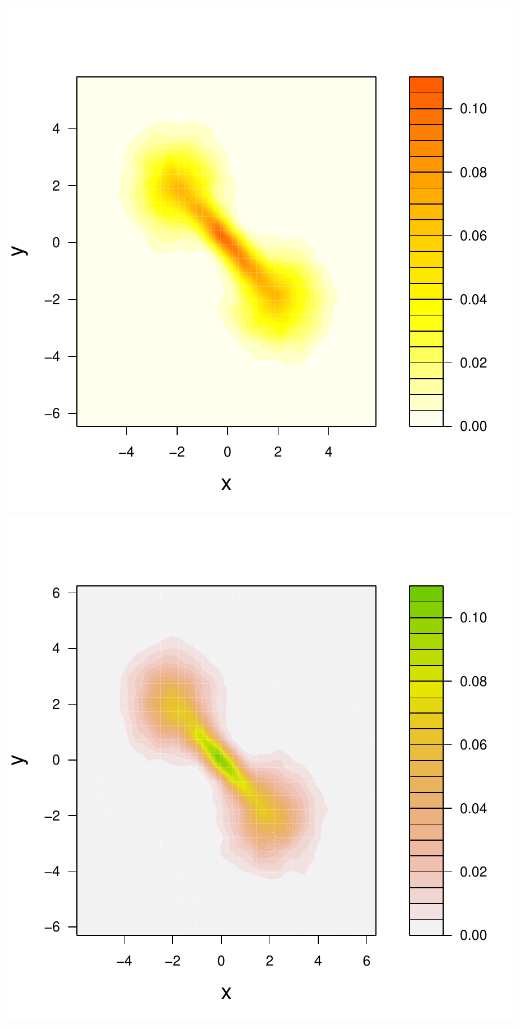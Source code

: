 \documentclass[a4paper,11pt]{article}
\begin{document}
\begin{center}
\includegraphics{kde-025}
\includegraphics{kde-026}
\end{center}
\end{document}
